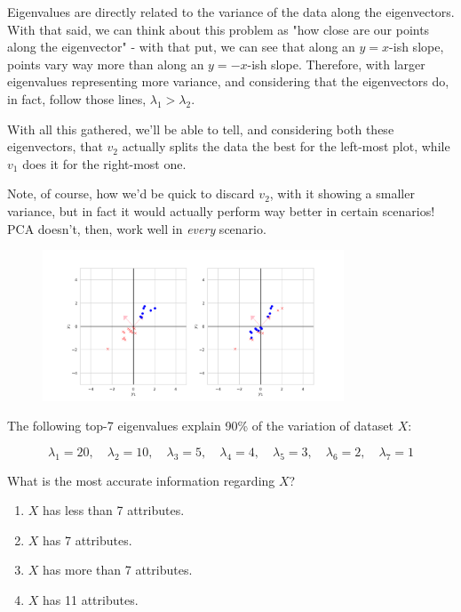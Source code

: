 \documentclass[12pt]{article}
\begin{document}
\begin{enumerate}[leftmargin=\labelsep]
  Eigenvalues are directly related to the variance of the data along the eigenvectors.
  With that said, we can think about this problem as "how close are our points along
  the eigenvector" - with that put, we can see that along an $y=x$-ish slope, points
  vary way more than along an $y=-x$-ish slope. Therefore, with larger
  eigenvalues representing more variance, and considering that the eigenvectors
  do, in fact, follow those lines, $\lambda_1 > \lambda_2$.

  With all this gathered, we'll be able to tell, and considering both
  these eigenvectors, that $v_2$ actually splits the data the best for the
  left-most plot, while $v_1$ does it for the right-most one.

  Note, of course, how we'd be quick to discard $v_2$, with it showing
  a smaller variance, but in fact it would actually perform way better in
  certain scenarios! PCA doesn't, then, work well in \textit{every} scenario.

  \begin{figure}[H]
    \centering
    \includegraphics[width=0.8\textwidth]{assets/ex-2/scaled-samples.png}
    \label{fig:samples-2-scaled}
  \end{figure}

  \begin{tcolorbox}[enhanced jigsaw,halign=center,colback=bg,boxrule=0pt,arc=1pt]
    \item The following top-7 eigenvalues explain 90\% of the variation of dataset $X$:

    \begin{equation*}
      \lambda_1 = 20, \quad \lambda_2 = 10, \quad \lambda_3 = 5, \quad \lambda_4 = 4, \quad \lambda_5 = 3, \quad \lambda_6 = 2, \quad \lambda_7 = 1
    \end{equation*}

    What is the most accurate information regarding $X$?

    \begin{enumerate}
      \item $X$ has less than 7 attributes.
      \item $X$ has 7 attributes.
      \item $X$ has more than 7 attributes.
      \item $X$ has 11 attributes.
    \end{enumerate}
  \end{tcolorbox}


\end{enumerate}
\end{document}
